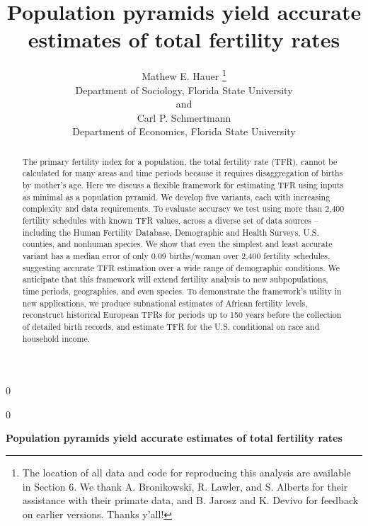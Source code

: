 \documentclass[12pt]{article}
\newcommand{\blind}{0}
\begin{document}
\def\spacingset#1{\renewcommand{\baselinestretch}%
{#1}\small\normalsize} \spacingset{1}



\blind
{
  \title{\bf Population pyramids yield accurate estimates of total fertility rates}

  \author{
        Mathew E. Hauer \thanks{The location of all data and code for reproducing this analysis are
available in Section 6. We thank A. Bronikowski, R. Lawler, and S.
Alberts for their assistance with their primate data, and B. Jarosz and
K. Devivo for feedback on earlier versions. Thanks y'all!} \\
    Department of Sociology, Florida State University\\
     and \\     Carl P. Schmertmann \\
    Department of Economics, Florida State University\\
      }
  \maketitle
} \fi

\blind
{
  \bigskip
  \bigskip
  \bigskip
  \begin{center}
    {\LARGE\bf Population pyramids yield accurate estimates of total fertility rates}
  \end{center}
  \medskip
} \fi

\bigskip
\begin{abstract}
The primary fertility index for a population, the total fertility rate
(TFR), cannot be calculated for many areas and time periods because it
requires disaggregation of births by mother's age. Here we discuss a
flexible framework for estimating TFR using inputs as minimal as a
population pyramid. We develop five variants, each with increasing
complexity and data requirements. To evaluate accuracy we test using
more than 2,400 fertility schedules with known TFR values, across a
diverse set of data sources -- including the Human Fertility Database,
Demographic and Health Surveys, U.S. counties, and nonhuman species. We
show that even the simplest and least accurate variant has a median
error of only 0.09 births/woman over 2,400 fertility schedules,
suggesting accurate TFR estimation over a wide range of demographic
conditions. We anticipate that this framework will extend fertility
analysis to new subpopulations, time periods, geographies, and even
species. To demonstrate the framework's utility in new applications, we
produce subnational estimates of African fertility levels, reconstruct
historical European TFRs for periods up to 150 years before the
collection of detailed birth records, and estimate TFR for the U.S.
conditional on race and household income.
\end{abstract}
\end{document}
